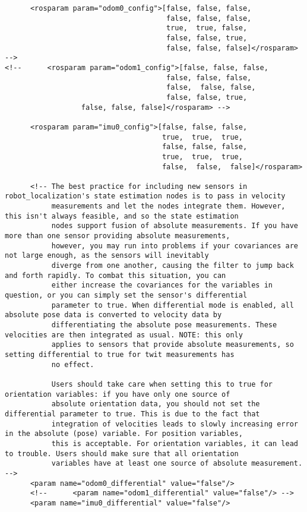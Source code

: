 \begin{verbatim}
      <rosparam param="odom0_config">[false, false, false,
                                      false, false, false,
                                      true,  true, false,
                                      false, false, true,
                                      false, false, false]</rosparam> -->
<!--      <rosparam param="odom1_config">[false, false, false,
                                      false, false, false,
                                      false,  false, false,
                                      false, false, true,
                  false, false, false]</rosparam> -->

      <rosparam param="imu0_config">[false, false, false,
                                     true,  true,  true,
                                     false, false, false,
                                     true,  true,  true,
                                     false,  false,  false]</rosparam>

      <!-- The best practice for including new sensors in robot_localization's state estimation nodes is to pass in velocity
           measurements and let the nodes integrate them. However, this isn't always feasible, and so the state estimation
           nodes support fusion of absolute measurements. If you have more than one sensor providing absolute measurements,
           however, you may run into problems if your covariances are not large enough, as the sensors will inevitably
           diverge from one another, causing the filter to jump back and forth rapidly. To combat this situation, you can
           either increase the covariances for the variables in question, or you can simply set the sensor's differential
           parameter to true. When differential mode is enabled, all absolute pose data is converted to velocity data by
           differentiating the absolute pose measurements. These velocities are then integrated as usual. NOTE: this only
           applies to sensors that provide absolute measurements, so setting differential to true for twit measurements has
           no effect.

           Users should take care when setting this to true for orientation variables: if you have only one source of
           absolute orientation data, you should not set the differential parameter to true. This is due to the fact that
           integration of velocities leads to slowly increasing error in the absolute (pose) variable. For position variables,
           this is acceptable. For orientation variables, it can lead to trouble. Users should make sure that all orientation
           variables have at least one source of absolute measurement. -->
      <param name="odom0_differential" value="false"/>
      <!--      <param name="odom1_differential" value="false"/> -->
      <param name="imu0_differential" value="false"/>


\end{verbatim}
